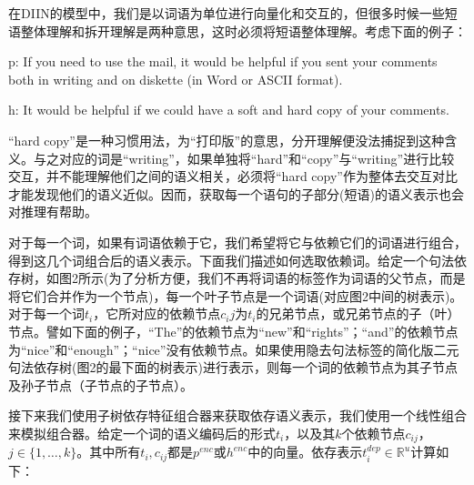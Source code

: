 \documentclass[UTF8,11pt,a4paper,nofonts]{ctexart}
\begin{document}
在DIIN的模型中，我们是以词语为单位进行向量化和交互的，但很多时候一些短语整体理解和拆开理解是两种意思，这时必须将短语整体理解。考虑下面的例子：


p: If you need to use the mail, it would be helpful if you sent your comments both in writing and on diskette (in Word or ASCII format).

h: It would be helpful if we could have a soft and hard copy of your comments.

“hard copy”是一种习惯用法，为“打印版”的意思，分开理解便没法捕捉到这种含义。与之对应的词是“writing”，如果单独将“hard”和“copy”与“writing”进行比较交互，并不能理解他们之间的语义相关，必须将“hard copy”作为整体去交互对比才能发现他们的语义近似。因而，获取每一个语句的子部分(短语)的语义表示也会对推理有帮助。


对于每一个词，如果有词语依赖于它，我们希望将它与依赖它们的词语进行组合，得到这几个词组合后的语义表示。下面我们描述如何选取依赖词。给定一个句法依存树，如图2所示(为了分析方便，我们不再将词语的标签作为词语的父节点，而是将它们合并作为一个节点)，每一个叶子节点是一个词语(对应图2中间的树表示)。对于每一个词$t_i$，它所对应的依赖节点$c_ij$为$t_i$的兄弟节点，或兄弟节点的子（叶）节点。譬如下面的例子，“The”的依赖节点为“new”和“rights”；“and”的依赖节点为“nice”和“enough”；“nice”没有依赖节点。如果使用隐去句法标签的简化版二元句法依存树(图2的最下面的树表示)进行表示，则每一个词的依赖节点为其子节点及孙子节点（子节点的子节点）。



接下来我们使用子树依存特征组合器来获取依存语义表示，我们使用一个线性组合来模拟组合器。给定一个词的语义编码后的形式$t_{i}$，以及其$k$个依赖节点$c_{ij}$，$j \in \{1,\dots,k\}$。其中所有$t_{i}, c_{ij}$都是$p^{enc}$或$h^{enc}$中的向量。依存表示$t^{dep}_i \in \mathbb{R}^u$计算如下：
\end{document}
